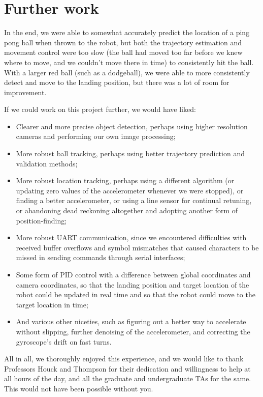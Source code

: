 \documentclass[letterpaper, 11pt]{article}
\begin{document}
\clearpage
\section{Further work}
In the end, we were able to somewhat accurately predict the location of a ping pong ball when thrown to the robot, but both the trajectory estimation and movement control were too slow (the ball had moved too far before we knew where to move, and we couldn't move there in time) to consistently hit the ball. With a larger red ball (such as a dodgeball), we were able to more consistently detect and move to the landing position, but there was a lot of room for improvement.

If we could work on this project further, we would have liked:
\begin{itemize}
    \item Clearer and more precise object detection, perhaps using higher resolution cameras and performing our own image processing;
    \item More robust ball tracking, perhaps using better trajectory prediction and validation methods;
    \item More robust location tracking, perhaps using a different algorithm (or updating zero values of the accelerometer whenever we were stopped), or finding a better accelerometer, or using a line sensor for continual retuning, or abandoning dead reckoning altogether and adopting another form of position-finding;
    \item More robust UART communication, since we encountered difficulties with received buffer overflows and symbol mismatches that caused characters to be missed in sending commands through serial interfaces;
    \item Some form of PID control with a difference between global coordinates and camera coordinates, so that the landing position and target location of the robot could be updated in real time and so that the robot could move to the target location in time;
    \item And various other niceties, such as figuring out a better way to accelerate without slipping, further denoising of the accelerometer, and correcting the gyroscope's drift on fast turns.
\end{itemize}
All in all, we thoroughly enjoyed this experience, and we would like to thank Professors Houck and Thompson for their dedication and willingness to help at all hours of the day, and all the graduate and undergraduate TAs for the same. This would not have been possible without you.
\end{document}

